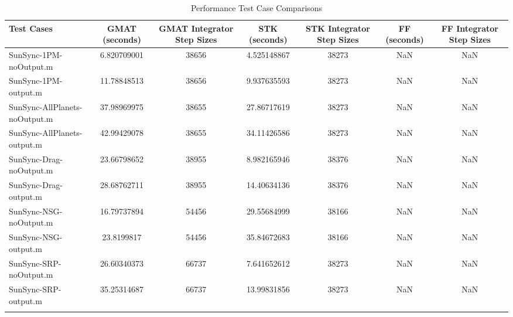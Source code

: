 \begin{table}[htbp!]
\centering
\caption{ Performance Test Case Comparisons}
      \begin{tabular}{lcccccc}
      \hline\hline
          Test Cases & GMAT (seconds) & GMAT Integrator Step Sizes & STK (seconds) & STK Integrator Step Sizes & FF (seconds) & FF Integrator Step Sizes \\
         \hline
         SunSync-1PM-noOutput.m & 6.820709001 & 38656 & 4.525148867 & 38273 & NaN & NaN \\
         SunSync-1PM-output.m & 11.78848513 & 38656 & 9.937635593 & 38273 & NaN & NaN \\
         SunSync-AllPlanets-noOutput.m & 37.98969975 & 38655 & 27.86717619 & 38273 & NaN & NaN \\
         SunSync-AllPlanets-output.m & 42.99429078 & 38655 & 34.11426586 & 38273 & NaN & NaN \\
         SunSync-Drag-noOutput.m & 23.66798652 & 38955 & 8.982165946 & 38376 & NaN & NaN \\
         SunSync-Drag-output.m & 28.68762711 & 38955 & 14.40634136 & 38376 & NaN & NaN \\
         SunSync-NSG-noOutput.m & 16.79737894 & 54456 & 29.55684999 & 38166 & NaN & NaN \\
         SunSync-NSG-output.m & 23.8199817 & 54456 & 35.84672683 & 38166 & NaN & NaN \\
         SunSync-SRP-noOutput.m & 26.60340373 & 66737 & 7.641652612 & 38273 & NaN & NaN \\
         SunSync-SRP-output.m & 35.25314687 & 66737 & 13.99831856 & 38273 & NaN & NaN \\
      \hline\hline
      \label{Table: Performance3} 
\end{tabular}
\end{table}

